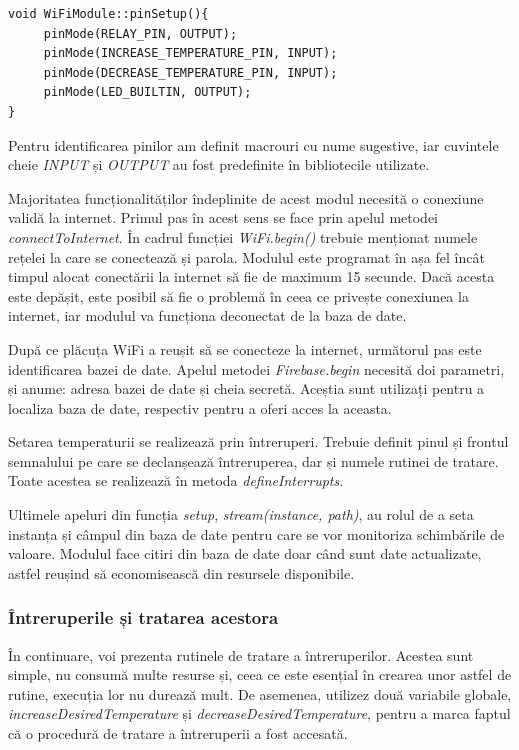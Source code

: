\begin{lstlisting}
void WiFiModule::pinSetup(){
     pinMode(RELAY_PIN, OUTPUT);
     pinMode(INCREASE_TEMPERATURE_PIN, INPUT);
     pinMode(DECREASE_TEMPERATURE_PIN, INPUT);
     pinMode(LED_BUILTIN, OUTPUT);
}
\end{lstlisting}

\vspace{2em}	

	Pentru identificarea pinilor am definit macrouri cu nume sugestive, iar cuvintele cheie \textit{INPUT} și \textit{OUTPUT} au fost predefinite în bibliotecile utilizate.

	Majoritatea funcționalităților îndeplinite de acest modul necesită o conexiune validă la internet. Primul pas în acest sens se face prin apelul metodei \textit{connectToInternet}. În cadrul funcției \textit{WiFi.begin()} trebuie menționat numele rețelei la care se conectează și parola. Modulul este programat în așa fel încât timpul alocat conectării la internet să fie de maximum 15 secunde. Dacă acesta este depășit, este posibil să fie o problemă în ceea ce privește conexiunea la internet, iar modulul va funcționa deconectat de la baza de date.
 
	După ce plăcuța WiFi a reușit să se conecteze la internet, următorul pas este identificarea bazei de date. Apelul metodei \textit{Firebase.begin} necesită doi parametri, și anume: adresa bazei de date și cheia secretă. Aceștia sunt utilizați pentru a localiza baza de date, respectiv pentru a oferi acces la aceasta.

	Setarea temperaturii se realizează prin întreruperi. Trebuie definit pinul și frontul semnalului pe care se declanșează întreruperea, dar și numele rutinei de tratare. Toate acestea se realizează în metoda \textit{defineInterrupts}.

	Ultimele apeluri din funcția \textit{setup}, \textit{stream(instance, path)}, au rolul de a seta instanța și câmpul din baza de date pentru care se vor monitoriza schimbările de valoare. Modulul face citiri din baza de date doar când sunt date actualizate, astfel reușind să economisească din resursele disponibile.

\subsubsection{Întreruperile și tratarea acestora}

	În continuare, voi prezenta rutinele de tratare a întreruperilor. Acestea sunt simple, nu consumă multe resurse și, ceea ce este esențial în crearea unor astfel de rutine, execuția lor nu durează mult. De asemenea, utilizez două variabile globale, \textit{increaseDesiredTemperature} și \textit{decreaseDesiredTemperature}, pentru a marca faptul că o procedură de tratare a întreruperii a fost accesată.

